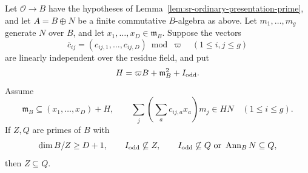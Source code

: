 \begin{srlemma}\label{lem:sr-paired-presentation-prime}
Let $\mathcal O\to B$ have the hypotheses of
Lemma~\ref{lem:sr-ordinary-presentation-prime}, and let
$A=B\oplus N$ be a finite commutative $B$-algebra as above.
Let $m_1,\ldots,m_g$ generate $N$ over $B$, and let
$x_1,\ldots,x_D\in\mathfrak m_B$.
Suppose the vectors
\[
                 \bar c_{ij}=(c_{ij,1},\ldots,c_{ij,D})\bmod\varpi
                    \quad(1\le i,j\le g)
\]
are linearly independent over the residue field, and put
\[
                  H=\varpi B+\mathfrak m_B^2+I_{\rm odd}.
\]
Assume
\[
 \mathfrak m_B\subseteq(x_1,\ldots,x_D)+H,\qquad
        \sum_j\left(\sum_a c_{ij,a}x_a\right)m_j\in HN
                                       \quad(1\le i\le g).
\]
If $Z,Q$ are primes of $B$ with
\[
 \dim B/Z\ge D+1,\qquad I_{\rm odd}\not\subseteq Z,\qquad
 I_{\rm odd}\not\subseteq Q\ \text{or}\ \operatorname{Ann}_BN\subseteq Q,
\]
then $Z\subseteq Q$.
\end{srlemma}
